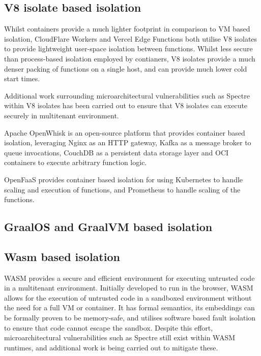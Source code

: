 \subsection{V8 isolate based isolation}
Whilst containers provide a much lighter footprint in comparison to VM based isolation, CloudFlare Workers\cite{CloudComputingContainers2018} and Vercel Edge Functions\cite{EdgeRuntime} both utilise V8 isolates to provide lightweight user-space isolation between functions. Whilst less secure than process-based isolation employed by contianers, V8 isolates provide a much denser packing of functions on a single host, and can provide much lower cold start times.

Additional work surrounding microarchitectural vulnerabilities such as Spectre within V8 isolates has been carried out to ensure that V8 isolates can execute securely in multitenant environment\cite{schwarzlRobustScalableProcess2022}.

Apache OpenWhisk\cite{apacheOpenWhisk2024} is an open-source \faas{} platform that provides container based isolation, leveraging Nginx as an HTTP gateway, Kafka as a message broker to queue invocations, CouchDB as a persistent data storage layer and OCI containers to execute arbitrary function logic.

OpenFaaS\cite{ellisOpenFaaS2024} provides container based isolation for \faas{} using Kubernetes to handle scaling and execution of functions, and Prometheus to handle scaling of the functions.

\subsection{GraalOS and GraalVM based isolation}

\subsection{Wasm based isolation}
WASM provides a secure and efficient environment for executing untrusted code\cite{WebAssembly} in a multitenant environment. Initially developed to run in the browser, WASM allows for the execution of untrusted code in a sandboxed environment without the need for a full VM or container. It has formal semantics\cite{haasBringingWebSpeed2017}, its embeddings can be formally proven to be memory-safe\cite{SecurefoundationsVWasm2024}, and utilises software based fault isolation to ensure that code cannot escape the sandbox\cite{SecurityWebAssembly}. Despite this effort, microarchitectural vulnerabilities such as Spectre still exist within WASM runtimes, and additional work is being carried out to mitigate these\cite{narayanSwivelHardeningWebAssembly2021}.

